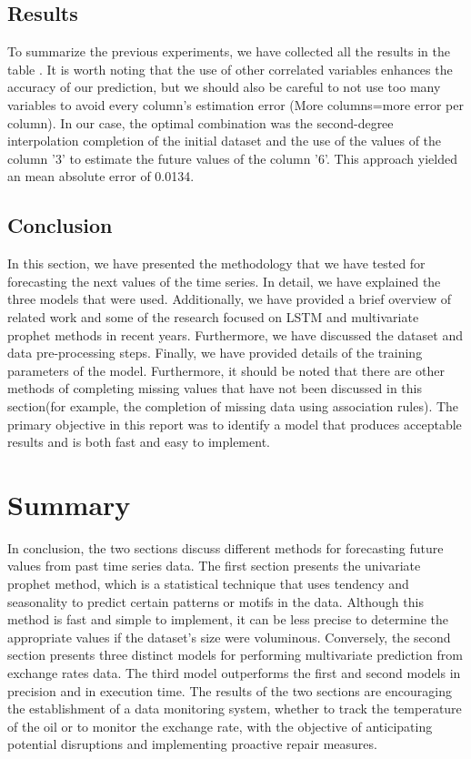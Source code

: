 \documentclass[10pt]{article}
\begin{document}
\begin{multicols}{2}
\subsection{Results}

To summarize the previous experiments, we have collected all the results in the table .\newline
It is worth noting that the use of other correlated variables enhances the accuracy of our prediction, but we should also be careful to not use too many variables to avoid every column's estimation error (More columns=more error per column).\newline
In our case, the optimal combination was the second-degree interpolation completion of the initial dataset and the use of the values of the column '3' to estimate the future values of the column '6'.\newline
This approach yielded an mean absolute error of 0.0134.



\subsection{Conclusion}
In this section, we have presented the methodology that we have tested for forecasting the next values of the time series. In detail, we have explained the three models that were used. Additionally, we have provided a brief overview of related work and some of the research focused on LSTM and multivariate prophet methods in recent years. Furthermore, we have discussed the dataset and data pre-processing steps. Finally, we have provided details of the training parameters of the model.
Furthermore, it should be noted that there are other methods of completing missing values that have not been discussed in this section(for example, the completion of missing data using association rules). The primary objective in this report was to identify a model that produces acceptable results and is both fast and easy to implement.

\section{Summary}
In conclusion, the two sections discuss different methods for forecasting future values from past time series data. The first section presents the univariate prophet method, which is a statistical technique that uses tendency and seasonality to predict certain patterns or motifs in the data. Although this method is fast and simple to implement, it can be less precise to determine the appropriate values if the dataset's size were voluminous. \newline
Conversely, the second section presents three distinct models for performing multivariate prediction from exchange rates data. The third model outperforms the first and second models in precision and in execution time.\newline
The results of the two sections are encouraging the establishment of a data monitoring system, whether to track the temperature of the oil or to monitor the exchange rate, with the objective of anticipating potential disruptions and implementing proactive repair measures.


\end{multicols}
\end{document}
